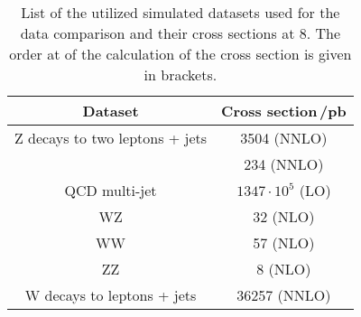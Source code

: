 
\begin{table}[h]
    \begin{center}
        \caption[List  of all data samples used for the data simulation comparison.]{List of the utilized simulated datasets used for the data comparison and their cross sections at 8\TeV{}. The order at of the calculation of the cross section is given in brackets.}
        \label{tab:DCDS}
        \begin{tabular}{c c}
            Dataset & Cross section\,/\unit{pb} \\
            \midrule[2pt]
            Z decays to two leptons + jets & 3504 (NNLO)  \\
            \ttbar{} & 234 (NNLO) \\
            QCD multi-jet  & $1347\cdot10^{5}$ (LO) \\
            WZ & 32 (NLO) \\
            WW & 57 (NLO) \\
            ZZ & 8 (NLO) \\
            W decays to leptons + jets & 36257 (NNLO) \\
        \end{tabular}
    \end{center}
\end{table}